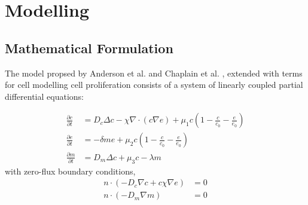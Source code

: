 \section{Modelling}

\subsection{Mathematical Formulation}

The model propsed by Anderson et al. \cite{anderson_continuous_1998,anderson_mathematical_2000} 
and Chaplain et al. \cite{anderson_continuous_1998,chaplain_mathematical_2006,chaplain_mathematical_2006-1,franssen_mathematical_2019}, extended with terms for cell modelling cell proliferation consists of a system of linearly coupled partial differential equations: 

\begin{align}
	\frac{\partial c}{\partial t} &= D_c \Delta c - \chi \nabla \cdot (c\nabla e)  + \mu_1 c\left(1-\frac{c}{c_0}-\frac{e}{e_0}\right)\label{eq1}\\
	\frac{\partial e}{\partial t} &= -\delta m e  + \mu_2 c\left(1-\frac{c}{c_0}-\frac{e}{e_0}\right)\label{eq2}\\
	\frac{\partial m}{\partial t} &= D_m \Delta c + \mu_3 c - \lambda m\label{eq3}
\end{align}
with zero-flux boundary conditions, 
\begin{align}
	n\cdot (-D_c \nabla c + c \chi\nabla e) &= 0 \label{eq4}\\
	n \cdot (-D_m\nabla m ) &= 0\label{eq5}
\end{align}

